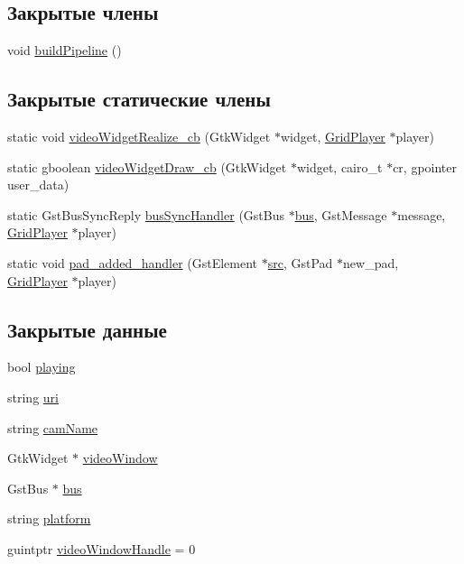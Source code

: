 \subsection*{Закрытые члены}
\begin{DoxyCompactItemize}
\item 
void \hyperlink{class_grid_player_a435af1383c7f936d6db8cee26fef4df4}{build\+Pipeline} ()
\end{DoxyCompactItemize}
\subsection*{Закрытые статические члены}
\begin{DoxyCompactItemize}
\item 
static void \hyperlink{class_grid_player_a74519abbce11aa02f2f97826ca517abb}{video\+Widget\+Realize\+\_\+cb} (Gtk\+Widget $\ast$widget, \hyperlink{class_grid_player}{Grid\+Player} $\ast$player)
\item 
static gboolean \hyperlink{class_grid_player_ad0dead895ce34fd82123b0770602ea3b}{video\+Widget\+Draw\+\_\+cb} (Gtk\+Widget $\ast$widget, cairo\+\_\+t $\ast$cr, gpointer user\+\_\+data)
\item 
static Gst\+Bus\+Sync\+Reply \hyperlink{class_grid_player_a6c10419eae272fa948b2b6391d923e4a}{bus\+Sync\+Handler} (Gst\+Bus $\ast$\hyperlink{class_grid_player_a3ef4c8f2e99916f1416fae6d881269e7}{bus}, Gst\+Message $\ast$message, \hyperlink{class_grid_player}{Grid\+Player} $\ast$player)
\item 
static void \hyperlink{class_grid_player_a5ba48d7c46b448125e2a6ad0ff6f92a3}{pad\+\_\+added\+\_\+handler} (Gst\+Element $\ast$\hyperlink{class_grid_player_a6c6ceb002f92458fa5daa5cd3109a5e1}{src}, Gst\+Pad $\ast$new\+\_\+pad, \hyperlink{class_grid_player}{Grid\+Player} $\ast$player)
\end{DoxyCompactItemize}
\subsection*{Закрытые данные}
\begin{DoxyCompactItemize}
\item 
bool \hyperlink{class_grid_player_a70d7b91928b6e346159ff592a109fddd}{playing}
\item 
string \hyperlink{class_grid_player_ae5257afc53ae7449800702444cbdd484}{uri}
\item 
string \hyperlink{class_grid_player_abc88f204b5eac4b1e46618375bd02a1c}{cam\+Name}
\item 
Gtk\+Widget $\ast$ \hyperlink{class_grid_player_a582df2d5915ae3c58a66c62c107fad96}{video\+Window}
\item 
Gst\+Bus $\ast$ \hyperlink{class_grid_player_a3ef4c8f2e99916f1416fae6d881269e7}{bus}
\item 
string \hyperlink{class_grid_player_a694c70fa87a2c02929cd9c9fe5018b49}{platform}
\item 
guintptr \hyperlink{class_grid_player_a38da19028ae6bde2f55919eea02001ac}{video\+Window\+Handle} = 0
\end{DoxyCompactItemize}


